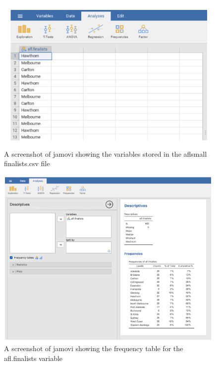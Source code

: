 \documentclass[
]{book}
\begin{document}
\begin{figure}
\includegraphics[width=0.9\linewidth]{images/Figure12} \caption{A screenshot of jamovi showing the variables stored in the aflsmall finalists.csv file}\label{fig:fig4-5}
\end{figure}

\begin{figure}
\includegraphics[width=0.9\linewidth]{images/Figure13} \caption{A screenshot of jamovi showing the frequency table for the afl.finalists variable}\label{fig:fig4-6}
\end{figure}
\end{document}
